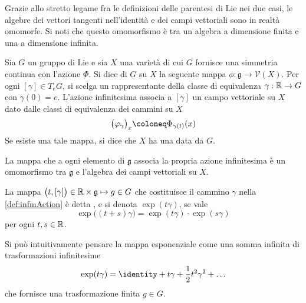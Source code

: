 Grazie allo stretto legame fra le definizioni delle parentesi di Lie nei due casi, le algebre dei vettori tangenti nell'identità e dei campi vettoriali sono in realtà omomorfe. Si noti che questo omomorfismo è tra un algebra a dimensione finita e una a dimensione infinita.

\begin{definition} \label{def:infmAction}
  Sia $G$ un gruppo di Lie e sia $X$ una varietà di cui $G$ fornisce una simmetria continua con l'azione $\Phi$. Si dice  di $G$ su $X$ la seguente mappa $\phi: \mathfrak{g} \to \mathcal{V}(X)$. Per ogni $[\gamma] \in T_e G$, si scelga un rappresentante della classe di equivalenza $\gamma:\mathbb{R}\to G$ con $\gamma(0) = e$. L'azione infinitesima associa a $[\gamma]$ un campo vettoriale su $X$ dato dalle classi di equivalenza dei cammini su $X$
  \begin{equation}
  \big(\phi_{\gamma}\big)_x \defeq \Phi_{\gamma(t)} (x)
  \end{equation}
  Se esiste una tale mappa, si dice che $X$ ha una  data da $G$.
\end{definition}
\begin{theorem}
  La mappa che a ogni elemento di $\mathfrak{g}$ associa la propria azione infinitesima è un omomorfismo tra $\mathfrak{g}$ e l'algebra dei campi vettoriali su $X$.
\end{theorem}
\begin{definition}
  La mappa $\big(t, [\gamma]\big) \in \mathbb{R} \times  \mathfrak{g} \mapsto g \in G$ che costituisce il cammino $\gamma$ nella \autoref{def:infmAction} è detta , e si denota $\exp(t \gamma)$, se vale 
  \begin{equation}
    \exp\big((t+s) \gamma\big) = \exp(t \gamma) \cdot  \exp (s \gamma)
  \end{equation} 
  per ogni $t,s \in \mathbb{R}$.
\end{definition}
\begin{remark}
  Si può intuitivamente pensare la mappa esponenziale come una somma infinita di trasformazioni infinitesime
  \begin{equation}
  \exp(t \gamma) = \identity + t \gamma + \frac{1}{2} t^2 \gamma^2 + \ldots
  \end{equation} 
  che fornisce una trasformazione finita $g \in G$.
\end{remark} 

